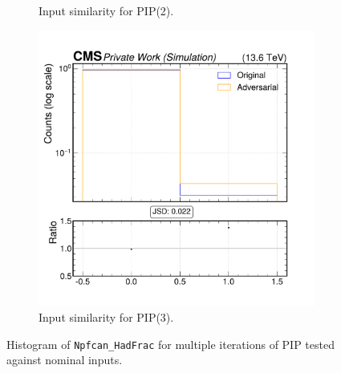 \begin{figure}[h]
\begin{subfigure}[t]{0.32\textwidth}
    \caption{Input similarity for PIP(2).}
  \end{subfigure}\hfill
  \begin{subfigure}[t]{0.32\textwidth}
    \includegraphics[width=\linewidth]{media/output/features/compare/intprob_3/cmp_npf_arr_Npfcan_HadFrac.pdf}
    \caption{Input similarity for PIP(3).}
  \end{subfigure}

  \caption{Histogram of \texttt{Npfcan\_HadFrac} for multiple iterations of PIP tested against nominal inputs.}
  \label{fig:intprob_input_Npfcan_HadFrac}
\end{figure}
